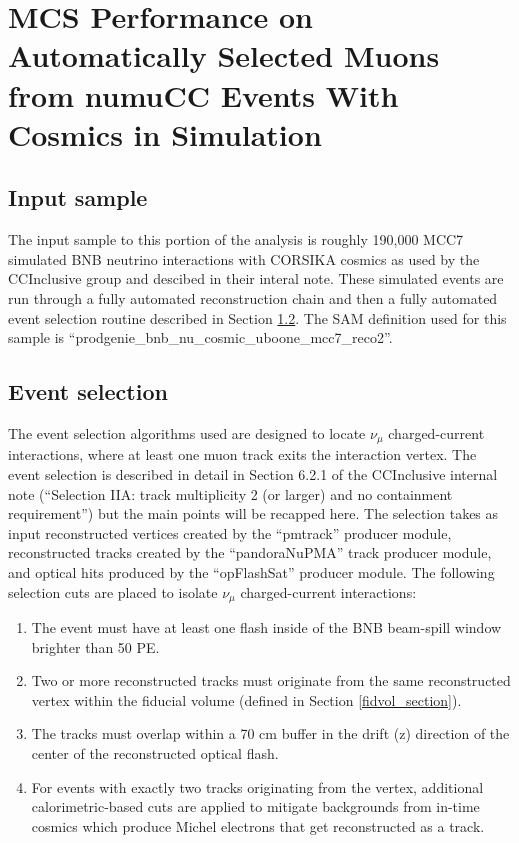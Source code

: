 \section{MCS Performance on Automatically Selected Muons from numuCC Events With Cosmics in Simulation}\label{MC_performance_section}

\subsection{Input sample}\label{MC_BNB_input_sample_section}
The input sample to this portion of the analysis is roughly 190,000 MCC7 simulated BNB neutrino interactions with CORSIKA cosmics as used by the CCInclusive group and descibed in their interal note\cite{CCIncInternalNote}. These simulated events are run through a fully automated reconstruction chain and then a fully automated event selection routine described in Section \ref{MC_BNB_eventselection_section}. The SAM definition used for this sample is ``prodgenie\_bnb\_nu\_cosmic\_uboone\_mcc7\_reco2''.

\subsection{Event selection}\label{MC_BNB_eventselection_section}
The event selection algorithms used are designed to locate $\nu_\mu$ charged-current interactions, where at least one muon track exits the interaction vertex. The event selection is described in detail in Section 6.2.1 of the {\ub} CCInclusive internal note (``Selection IIA: track multiplicity 2 (or larger) and no containment requirement'')\cite{CCIncInternalNote}  but the main points will be recapped here. The selection takes as input reconstructed vertices created by the ``pmtrack'' producer module, reconstructed tracks created by the ``pandoraNuPMA'' track producer module, and optical hits produced by the ``opFlashSat'' producer module. The following selection cuts are placed to isolate $\nu_\mu$ charged-current interactions:
\begin{enumerate}
\item The event must have at least one flash inside of the BNB beam-spill window brighter than 50 PE.
\item Two or more reconstructed tracks must originate from the same reconstructed vertex within the fiducial volume (defined in Section \ref{fidvol_section}).
\item The tracks must overlap within a 70 cm buffer in the drift (z) direction of the center of the reconstructed optical flash.
\item For events with exactly two tracks originating from the vertex, additional calorimetric-based cuts are applied to mitigate backgrounds from in-time cosmics which produce Michel electrons that get reconstructed as a track.
\end{enumerate}

